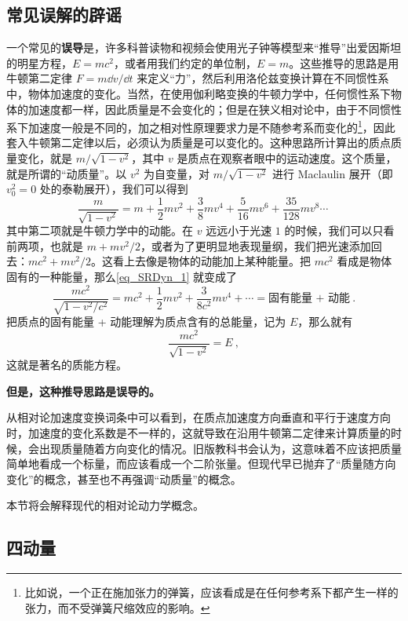 \subsection{常见误解的辟谣}
一个常见的\textbf{误导}是，许多科普读物和视频会使用光子钟等模型来“推导”出爱因斯坦的明星方程，$E=mc^2$，或者用我们约定的单位制，$E=m$。这些推导的思路是用牛顿第二定律 $F=m\dd v/\dd t$ 来定义“力”，然后利用洛伦兹变换计算在不同惯性系中，物体加速度的变化。当然，在使用伽利略变换的牛顿力学中，任何惯性系下物体的加速度都一样，因此质量是不会变化的；但是在狭义相对论中，由于不同惯性系下加速度一般是不同的，加之相对性原理要求力是不随参考系而变化的\footnote{比如说，一个正在施加张力的弹簧，应该看成是在任何参考系下都产生一样的张力，而不受弹簧尺缩效应的影响。}，因此套入牛顿第二定律以后，必须认为质量是可以变化的。这种思路所计算出的质点质量变化，就是 $m/\sqrt{1-v^2}$，其中 $v$ 是质点在观察者眼中的运动速度。这个质量，就是所谓的“动质量”。以 $v^2$ 为自变量，对 $m/\sqrt{1-v^2}$ 进行 Maclaulin 展开（即 $v_0^2=0$ 处的泰勒展开），我们可以得到
\begin{equation}\label{eq_SRDyn_1}
\frac{m}{\sqrt{1-v^2}} = m+\frac{1}{2}mv^2+\frac{3}{8}mv^4+\frac{5}{16}mv^6 + \frac{35}{128}mv^8\cdots~
\end{equation}
其中第二项就是牛顿力学中的动能。在 $v$ 远远小于光速 $1$ 的时候，我们可以只看前两项，也就是 $m+mv^2/2$，或者为了更明显地表现量纲，我们把光速添加回去：$mc^2+mv^2/2$。这看上去像是物体的动能加上某种能量。把 $mc^2$ 看成是物体固有的一种能量，那么\autoref{eq_SRDyn_1} 就变成了
\begin{equation}
\frac{mc^2}{\sqrt{1-v^2/c^2}} = mc^2+\frac{1}{2}mv^2+\frac{3}{8c^2}mv^4+\cdots=\text{固有能量 + 动能}~.
\end{equation}
把质点的固有能量 + 动能理解为质点含有的总能量，记为 $E$，那么就有
\begin{equation}
\frac{mc^2}{\sqrt{1-v^2}} = E~,
\end{equation}
这就是著名的质能方程。

\textbf{但是，这种推导思路是误导的。}


从相对论加速度变换词条中可以看到，在质点加速度方向垂直和平行于速度方向时，加速度的变化系数是不一样的，这就导致在沿用牛顿第二定律来计算质量的时候，会出现质量随着方向变化的情况。旧版教科书会认为，这意味着不应该把质量简单地看成一个标量，而应该看成一个二阶张量。但现代早已抛弃了“质量随方向变化”的概念，甚至也不再强调“动质量”的概念。

本节将会解释现代的相对论动力学概念。

\subsection{四动量}

